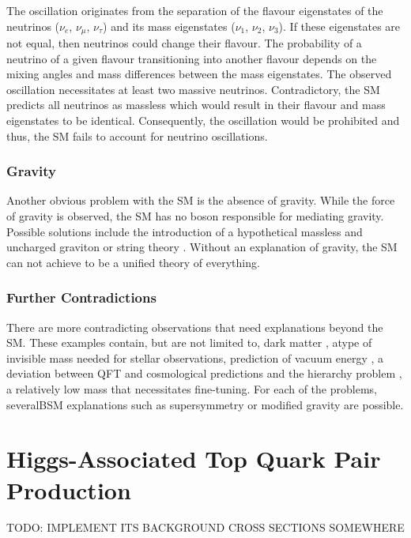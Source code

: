 \documentclass[bachelor,ngerman,english]{GAUBM}
\begin{document}
The oscillation originates from the separation of the flavour eigenstates of the neutrinos ($\nu_e$, $\nu_\mu$, $\nu_\tau$) and its mass eigenstates ($\nu_1$, $\nu_2$, $\nu_3$). If these eigenstates are not equal, then neutrinos could change their flavour. The probability of a neutrino of a given flavour transitioning into another flavour depends on the mixing angles and mass differences between the mass eigenstates. The observed oscillation necessitates at least two massive neutrinos. Contradictory, the SM predicts all neutrinos as massless which would result in their flavour and mass eigenstates to be identical. Consequently, the oscillation would be prohibited and thus, the SM fails to account for neutrino oscillations. 

\subsubsection*{Gravity}
Another obvious problem with the SM is the absence of gravity. While the force of gravity is observed, the SM has no boson responsible for mediating gravity. Possible solutions include the introduction of a hypothetical massless and uncharged graviton \cite{bsm_gravity_01} or string theory \cite{bsm_gravity_02}. Without an explanation of gravity, the SM can not achieve to be a unified theory of everything. 

\subsubsection*{Further Contradictions}
There are more contradicting observations that need explanations beyond the SM. These examples contain, but are not limited to, dark matter \cite{bsm_dark_matter_01,bsm_dark_matter_02,bsm_dark_matter_03}, atype of invisible mass needed for stellar observations, prediction of vacuum energy \cite{bsm_vacuum_energy}, a deviation between QFT and cosmological predictions and the hierarchy problem \cite{bsm_hierarchy}, a relatively low \Hboson mass that necessitates fine-tuning. For each of the problems, severalBSM explanations such as supersymmetry \cite{bsm_supersymmetry} or modified gravity \cite{bsm_mond} are possible.


\section{Higgs-Associated Top Quark Pair Production}
\label{sec:theory:tthww}
TODO: IMPLEMENT ITS BACKGROUND CROSS SECTIONS SOMEWHERE\\
\end{document}
